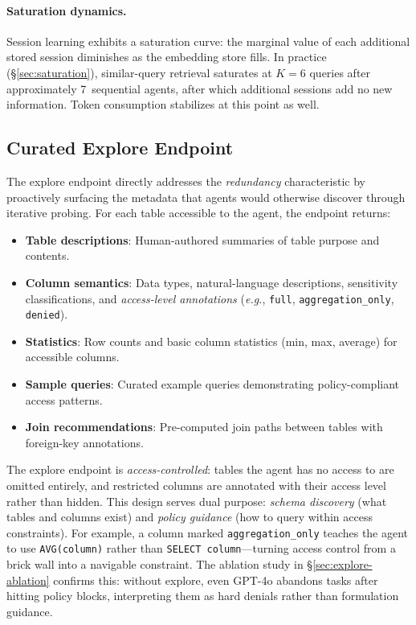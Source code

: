 \documentclass[sigconf, nonacm]{acmart}
\newcommand{\eg}{\textit{e.g.}\xspace}
\begin{document}
\paragraph{Saturation dynamics.}
Session learning exhibits a saturation curve: the marginal value of each
additional stored session diminishes as the embedding store fills.  In
practice (\S\ref{sec:saturation}), similar-query retrieval saturates at
$K{=}6$ queries after approximately 7~sequential agents, after which
additional sessions add no new information.  Token consumption stabilizes
at this point as well.

\subsection{Curated Explore Endpoint}
\label{sec:explore}

The explore endpoint directly addresses the \emph{redundancy} characteristic
by proactively surfacing the metadata that agents would otherwise discover
through iterative probing.  For each table accessible to the agent, the
endpoint returns:

\begin{itemize}[leftmargin=*]
  \item \textbf{Table descriptions}: Human-authored summaries of table purpose
        and contents.
  \item \textbf{Column semantics}: Data types, natural-language descriptions,
        sensitivity classifications, and \emph{access-level annotations}
        (\eg, \texttt{full}, \texttt{aggregation\_only}, \texttt{denied}).
  \item \textbf{Statistics}: Row counts and basic column statistics
        (min, max, average) for accessible columns.
  \item \textbf{Sample queries}: Curated example queries demonstrating
        policy-compliant access patterns.
  \item \textbf{Join recommendations}: Pre-computed join paths between tables
        with foreign-key annotations.
\end{itemize}

The explore endpoint is \emph{access-controlled}: tables the agent has no
access to are omitted entirely, and restricted columns are annotated with
their access level rather than hidden.  This design serves dual purpose:
\emph{schema discovery} (what tables and columns exist) and \emph{policy
guidance} (how to query within access constraints).  For example, a column
marked \texttt{aggregation\_only} teaches the agent to use
\texttt{AVG(column)} rather than \texttt{SELECT column}---turning access
control from a brick wall into a navigable constraint.  The ablation study
in \S\ref{sec:explore-ablation} confirms this: without explore, even GPT-4o
abandons tasks after hitting policy blocks, interpreting them as hard denials
rather than formulation guidance.
\end{document}

